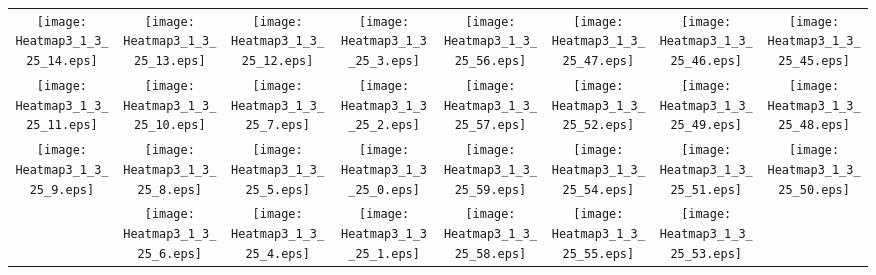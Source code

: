 \documentclass{standalone}
\begin{document}
\begin{tabular}{ *8{c} }
\texttt{[image: Heatmap3\_1\_3\_25\_14.eps]} & \texttt{[image: Heatmap3\_1\_3\_25\_13.eps]} & \texttt{[image: Heatmap3\_1\_3\_25\_12.eps]} & \texttt{[image: Heatmap3\_1\_3\_25\_3.eps]} & \texttt{[image: Heatmap3\_1\_3\_25\_56.eps]} & \texttt{[image: Heatmap3\_1\_3\_25\_47.eps]} & \texttt{[image: Heatmap3\_1\_3\_25\_46.eps]} & \texttt{[image: Heatmap3\_1\_3\_25\_45.eps]} \\
\texttt{[image: Heatmap3\_1\_3\_25\_11.eps]} & \texttt{[image: Heatmap3\_1\_3\_25\_10.eps]} & \texttt{[image: Heatmap3\_1\_3\_25\_7.eps]} & \texttt{[image: Heatmap3\_1\_3\_25\_2.eps]} & \texttt{[image: Heatmap3\_1\_3\_25\_57.eps]} & \texttt{[image: Heatmap3\_1\_3\_25\_52.eps]} & \texttt{[image: Heatmap3\_1\_3\_25\_49.eps]} & \texttt{[image: Heatmap3\_1\_3\_25\_48.eps]} \\
\texttt{[image: Heatmap3\_1\_3\_25\_9.eps]} & \texttt{[image: Heatmap3\_1\_3\_25\_8.eps]} & \texttt{[image: Heatmap3\_1\_3\_25\_5.eps]} & \texttt{[image: Heatmap3\_1\_3\_25\_0.eps]} & \texttt{[image: Heatmap3\_1\_3\_25\_59.eps]} & \texttt{[image: Heatmap3\_1\_3\_25\_54.eps]} & \texttt{[image: Heatmap3\_1\_3\_25\_51.eps]} & \texttt{[image: Heatmap3\_1\_3\_25\_50.eps]} \\
 & \texttt{[image: Heatmap3\_1\_3\_25\_6.eps]} & \texttt{[image: Heatmap3\_1\_3\_25\_4.eps]} & \texttt{[image: Heatmap3\_1\_3\_25\_1.eps]} & \texttt{[image: Heatmap3\_1\_3\_25\_58.eps]} & \texttt{[image: Heatmap3\_1\_3\_25\_55.eps]} & \texttt{[image: Heatmap3\_1\_3\_25\_53.eps]} &  
\end{tabular}
\end{document}
